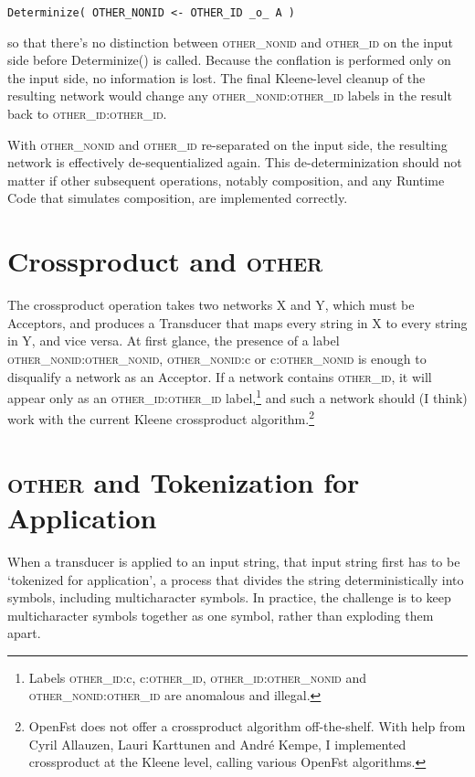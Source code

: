 \documentclass[letterpaper,11pt]{article}
\providecommand{\acro}{}\renewcommand{\acro}{\textsc}
\begin{document}
\begin{Verbatim}[fontsize=\footnotesize]
Determinize( OTHER_NONID <- OTHER_ID _o_ A )
\end{Verbatim}

\noindent
so that there's no distinction between \acro{other\_nonid} and \acro{other\_id} on
the input side before Determinize() is called.  Because the conflation is performed only on
the input side, no information is lost.  The final Kleene-level cleanup of the resulting network
would change any \acro{other\_nonid}:\acro{other\_id} labels in the result back to
\acro{other\_id}:\acro{other\_id}.

With \acro{other\_nonid} and \acro{other\_id} re-separated on the input side, the resulting network is effectively
de-sequentialized again.  
This de-determinization should not matter if other subsequent
operations, notably composition, and any
Runtime Code that simulates composition, are implemented correctly.

\section{Crossproduct and \acro{other}}

The crossproduct operation takes two networks X and Y, which must be Acceptors, and produces a Transducer
that maps every string in X to every string in Y, and vice versa.  At first glance, the presence of a
label \acro{other\_nonid}:\acro{other\_nonid}, \acro{other\_nonid}:c or c:\acro{other\_nonid} is enough 
to disqualify a network as an Acceptor.  If a
network contains \acro{other\_id}, it will appear only as an \acro{other\_id}:\acro{other\_id} label,\footnote{Labels
\acro{other\_id}:c, c:\acro{other\_id}, \acro{other\_id}:\acro{other\_nonid} and \acro{other\_nonid}:\acro{other\_id} are anomalous and
illegal.} 
and such a network should (I think) work with the current Kleene crossproduct
algorithm.\footnote{OpenFst does not offer a crossproduct algorithm off-the-shelf.  With help from Cyril
Allauzen, Lauri Karttunen and Andr\'e Kempe, I implemented crossproduct at the Kleene level,
calling
various OpenFst algorithms.}

\section{\acro{other} and Tokenization for Application}

When a transducer is applied to an input string, that input string first has to be `tokenized for
application', a process that divides the string deterministically into symbols, including multicharacter
symbols.  In practice, the challenge is to keep multicharacter symbols together as one symbol, rather than
exploding them apart.  
\end{document}
